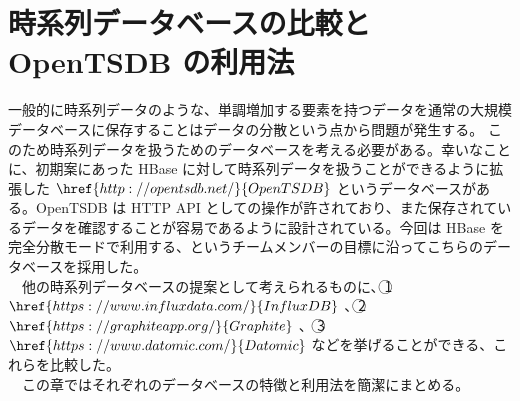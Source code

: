 \documentclass{scrartcl}
\begin{document}
\section{時系列データベースの比較と OpenTSDB の利用法}
\label{sec:org83dfa88}
一般的に時系列データのような、単調増加する要素を持つデータを通常の大規模データベースに保存することはデータの分散という点から問題が発生する。 \cite{hbase-reference} このため時系列データを扱うためのデータベースを考える必要がある。幸いなことに、初期案にあった HBase に対して時系列データを扱うことができるように拡張した \(\href{http://opentsdb.net/}{OpenTSDB}\) というデータベースがある。OpenTSDB は HTTP API としての操作が許されており、また保存されているデータを確認することが容易であるように設計されている。今回は HBase を完全分散モードで利用する、というチームメンバーの目標に沿ってこちらのデータベースを採用した。\\
　他の時系列データベースの提案として考えられるものに、\textcircled{\scriptsize 1} \(\href{https://www.influxdata.com/}{InfluxDB}\) 、\textcircled{\scriptsize 2} \(\href{https://graphiteapp.org/}{Graphite}\) 、 \textcircled{\scriptsize 3} \(\href{https://www.datomic.com/}{Datomic}\) などを挙げることができる、これらを比較した。\\
　この章ではそれぞれのデータベースの特徴と利用法を簡潔にまとめる。\\
\end{document}
